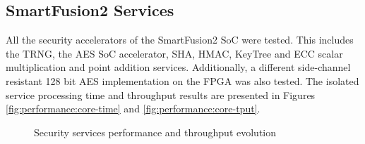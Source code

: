\subsection{SmartFusion2 Services}\label{chap:evaluation:board}

All the security accelerators of the SmartFusion2 SoC were tested. This includes the TRNG, the AES SoC accelerator, SHA, HMAC, KeyTree and ECC scalar multiplication and point addition services.
Additionally, a different side-channel resistant 128 bit AES implementation on the FPGA was also tested.
The isolated service processing time and throughput results are presented in Figures \ref{fig:performance:core-time} and \ref{fig:performance:core-tput}.
\begin{figure}[h!]
	\centering     %
	\caption{Security services performance and throughput evolution}
\end{figure}

